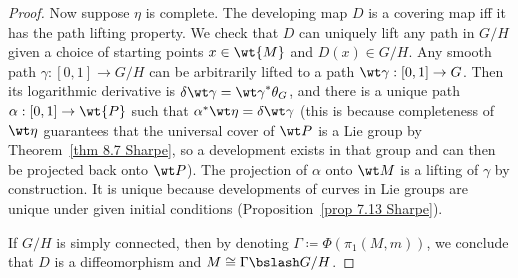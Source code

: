 \begin{proof}
    Now suppose $\eta$ is complete. The developing map $D$ is a covering map iff it has the path lifting property. We check that $D$ can uniquely lift any path in $G\slash H$ given a choice of starting points $x\in\wt{M}$ and $D(x)\in G\slash H$. Any smooth path $\gamma:[0,1]\to G\slash H$ can be arbitrarily lifted to a path $\wt\gamma:[0,1]\to G$. Then its logarithmic derivative is $\delta\wt\gamma={\wt\gamma}^\ast \theta_G$, and there is a unique path $\alpha:[0,1]\to \wt{P}$ such that $\alpha^\ast \wt\eta=\delta\wt\gamma$ (this is because completeness of $\wt\eta$ guarantees that the universal cover of $\wt P$ is a Lie group by Theorem~\ref{thm 8.7 Sharpe}, so a development exists in that group and can then be projected back onto $\wt P$). The projection of $\alpha$ onto $\wt M$ is a lifting of $\gamma$ by construction. It is unique because developments of curves in Lie groups are unique under given initial conditions (Proposition~\ref{prop 7.13 Sharpe}).

    If $G\slash H$ is simply connected, then by denoting $\Gamma\coloneqq \Phi(\pi_1(M,m))$, we conclude that $D$ is a diffeomorphism and $M\cong \Gamma\bslash G\slash H$.
\end{proof}

